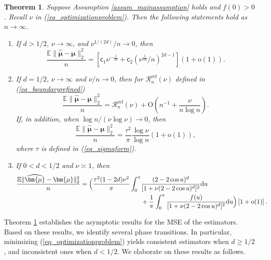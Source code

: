 \documentclass[11pt]{article}
\newtheorem{theorem}{Theorem}[section]
\newcommand{\sfc}{\mathsf{c}}
\newcommand{\dd}{\mathrm{d}}
\newcommand{\OO}{\mathrm{O}}
\newcommand{\oo}{\mathrm{o}}
\numberwithin{equation}{section}
\numberwithin{figure}{section}
\begin{document}
\begin{theorem}\label{thm_mainthm}
Suppose Assumption \ref{assum_mainassumption} holds and $f(0)>0$. Recall $\nu$ in (\ref{eq_optimizationproblem}). Then the following statements hold as $n\to\infty$.
\begin{enumerate}
\item[(1).] If $d>1/2$, $\nu\to\infty$, and $\nu^{1/(2d)}/n\to0$, then
\begin{equation}\label{eq_dgeaterthan12}
\frac{\mathbb{E}\|\widehat{\bm{\mu}}-\bm{\mu}\|_2^{2}}{n}=[\sfc_{1}\nu^{-\frac{1}{2d}}+\sfc_{2}(%
\nu^{\frac{1}{2d}}/n)^{2d-1}](1+\oo(1)).  
\end{equation}
\item[(2).] If $d=1/2$, $\nu\to\infty$ and $\nu/n\to0$, then for $\mathcal{R}^{\mathrm{ref}}_n(\nu)$ defined in (\ref{eq_boundaryrefined})
\begin{equation}\label{eq_dhalfrefined}
\frac{\mathbb{E}\|\widehat{\bm{\mu}}-\bm{\mu}\|_2^2}{n}
=\mathcal{R}^{\mathrm{ref}}_n(\nu)+\OO\left(n^{-1}+\frac{\nu}{n\log n}\right).
\end{equation}
If, in addition, when $\log n/(\nu\log\nu)\to0$, then
\begin{equation}\label{eq_dexactly1/2}
\frac{\mathbb{E}\|\widehat{\bm{\mu}}-\bm{\mu}\|_2^{2}}{n}=\frac{\tau^2}{\pi}\frac{\log\nu}{\log n}(1+\oo(1)), 
\end{equation}
where $\tau$ is defined in (\ref{eq_sigmaform}). 
\item[(3).] If $0<d<1/2$ and $\nu\asymp1$, then
\begin{align}\label{eq_dlessthan12}
\frac{\mathbb{E}\|\widehat{\bm{\mu}}-\bm{\mu}\|_2^{2}}{n}
=\Big(
\frac{\tau^2(1-2d)\nu^2}{\pi}
\int_{0}^{\pi}
&\frac{(2-2\cos u)^d}
{[1+\nu(2-2\cos u)^d]^2}\dd u
\notag\\
&
+\frac{1}{\pi}
\int_{0}^{\pi}
\frac{f(u)}
{[1+\nu(2-2\cos u)^d]^2}\dd u
\Big)
\left[1+\oo(1)\right].
\end{align}
\end{enumerate}  
\end{theorem}


Theorem \ref{thm_mainthm} establishes the asymptotic results for the MSE of the estimators. Based on these results, we identify several phase transitions. In particular, minimizing (\ref{eq_optimizationproblem}) yields consistent estimators when $d \geq 1/2$, and inconsistent ones when $d < 1/2$. We elaborate on these results as follows.
\end{document}
